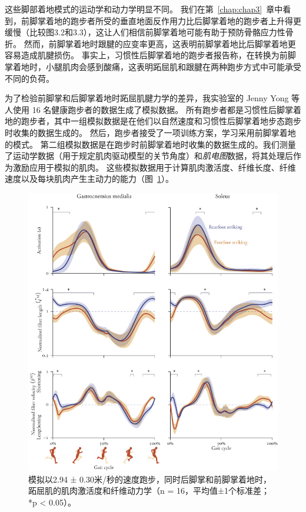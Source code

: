 这些脚部着地模式的运动学和动力学明显不同。
我们在第~\ref{chap:chap3}~章中看到，前脚掌着地的跑步者所受的垂直地面反作用力比后脚掌着地的跑步者上升得更缓慢（比较图3.2和3.3），这让人们相信前脚掌着地可能有助于预防骨骼应力性骨折。
然而，前脚掌着地时跟腱的应变率更高\cite{lyght2016effects}，这表明前脚掌着地比后脚掌着地更容易造成肌腱损伤。
事实上，习惯性后脚掌着地的跑步者报告称，在转换为前脚掌着地时，小腿肌肉会感到酸痛，这表明跖屈肌和跟腱在两种跑步方式中可能承受不同的负荷。


为了检验前脚掌和后脚掌着地时跖屈肌腱力学的差异，我实验室的 Jenny Yong 等人使用 16 名健康跑步者的数据生成了模拟数据。
所有跑步者都是习惯性后脚掌着地的跑步者，其中一组模拟数据是在他们以自然速度和习惯性后脚掌着地步态跑步时收集的数据生成的。
然后，跑步者接受了一项训练方案，学习采用前脚掌着地的模式。
第二组模拟数据是在跑步时前脚掌着地时收集的数据生成的。我们测量了运动学数据（用于规定肌肉驱动模型的关节角度）和\textit{肌电图}数据，将其处理后作为激励应用于模拟的肌肉。
这些模拟数据用于计算肌肉激活度、纤维长度、纤维速度以及每块肌肉产生主动力的能力（图~\ref{fig:12_10}）。

\begin{figure}[!htb]
	\centering
	\includegraphics[width=1.0\linewidth]{chap12/12_10}
	\caption{模拟以2.94 ± 0.30米/秒的速度跑步，同时后脚掌和前脚掌着地时，跖屈肌的肌肉激活度和纤维动力学（n = 16，平均值±1个标准差；*p < 0.05）\cite{yong2020foot}。 \label{fig:12_10}}
\end{figure}


